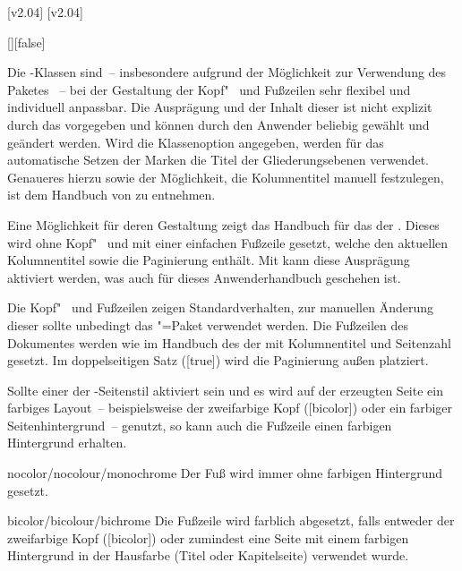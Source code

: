[v2.04]
[v2.04]
\begin{Declaration}{[\PBoolean]}[false]%
\printdeclarationlist%
%

Die \TUDScript-Klassen sind~-- insbesondere aufgrund der Möglichkeit zur 
Verwendung des Paketes ~-- bei der Gestaltung der 
Kopf"~ und Fußzeilen sehr flexibel und individuell anpassbar. Die Ausprägung 
und der Inhalt dieser ist nicht explizit durch das \CD vorgegeben und können 
durch den Anwender beliebig gewählt und geändert werden. Wird die Klassenoption 
 angegeben, werden für das automatische Setzen der Marken die 
Titel der Gliederungsebenen verwendet. Genaueres hierzu sowie der Möglichkeit, 
die Kolumnentitel manuell festzulegen, ist dem Handbuch von \KOMAScript{} zu 
entnehmen.

Eine Möglichkeit für deren Gestaltung zeigt das Handbuch für das \CD der \TnUD. 
Dieses wird ohne Kopf"~ und mit einer einfachen Fußzeile gesetzt, welche den 
aktuellen Kolumnentitel sowie die Paginierung enthält. Mit  kann 
diese Ausprägung aktiviert werden, was auch für dieses Anwenderhandbuch 
geschehen ist.
%
\begin{values}
\itemfalse
  Die Kopf"~ und Fußzeilen zeigen Standardverhalten, zur manuellen Änderung 
  dieser sollte unbedingt das \KOMAScript"=Paket  
  verwendet werden.
\itemtrue*
  Die Fußzeilen des Dokumentes werden wie im Handbuch des \CDs der \TnUD 
  mit Kolumnentitel und Seitenzahl gesetzt. Im doppelseitigen Satz 
  ([true]) wird die Paginierung außen platziert.
\end{values}
%
Sollte einer der -Seitenstil aktiviert sein und es wird 
auf der erzeugten Seite ein farbiges Layout~--  beispielsweise der zweifarbige 
Kopf ([bicolor]) oder ein farbiger Seitenhintergrund~-- genutzt, 
so kann auch die Fußzeile einen farbigen Hintergrund erhalten.
%
\begin{values}
\item[nocolor/nocolour/monochrome]
  Der Fuß wird immer ohne farbigen Hintergrund gesetzt.
\item[bicolor/bicolour/bichrome]
  Die Fußzeile wird farblich abgesetzt, falls entweder der zweifarbige Kopf
  ([bicolor]) oder zumindest eine Seite mit einem farbigen 
  Hintergrund in der Hausfarbe (Titel oder Kapitelseite) verwendet wurde.
\end{values}
\end{Declaration}

